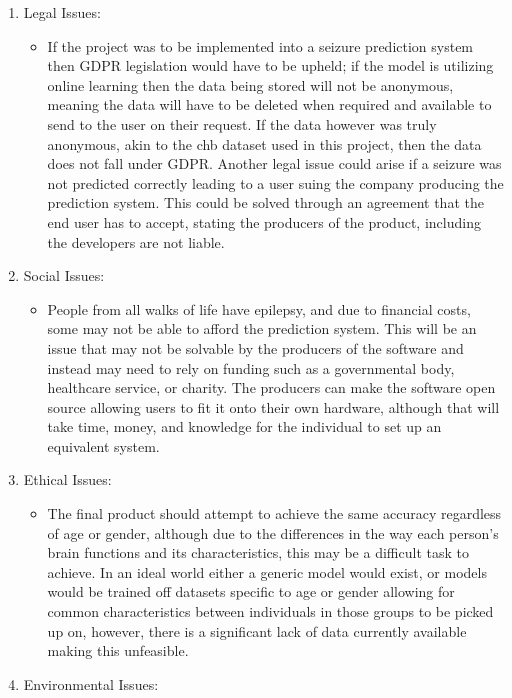 \documentclass[12pt]{article}
\begin{document}
\begin{enumerate}
    \item Legal Issues:
    \begin{itemize}
        \item If the project was to be implemented into a seizure prediction system then GDPR legislation would have to be upheld; if the model is utilizing online learning then the data being stored will not be anonymous, meaning the data will have to be deleted when required and available to send to the user on their request. If the data however was truly anonymous, akin to the \acrshort{chb} dataset used in this project, then the data does not fall under GDPR.
Another legal issue could arise if a seizure was not predicted correctly leading to a user suing the company producing the prediction system. This could be solved through an agreement that the end user has to accept, stating the producers of the product, including the developers are not liable.
    \end{itemize}
    \item Social Issues:
    \begin{itemize}
    	 \item People from all walks of life have epilepsy, and due to financial costs, some may not be able to afford the prediction system. This will be an issue that may not be solvable by the producers of the software and instead may need to rely on funding such as a governmental body, healthcare service, or charity. The producers can make the software open source allowing users to fit it onto their own hardware, although that will take time, money, and knowledge for the individual to set up an equivalent system.
    \end{itemize}
        \item Ethical Issues:
    \begin{itemize}
    	 \item The final product should attempt to achieve the same accuracy regardless of age or gender, although due to the differences in the way each person's brain functions and its characteristics, this may be a difficult task to achieve. In an ideal world either a generic model would exist, or models would be trained off datasets specific to age or gender allowing for common characteristics between individuals in those groups to be picked up on, however, there is a significant lack of data currently available making this unfeasible.
    \end{itemize}
        \item Environmental Issues:

\end{enumerate}
\end{document}
